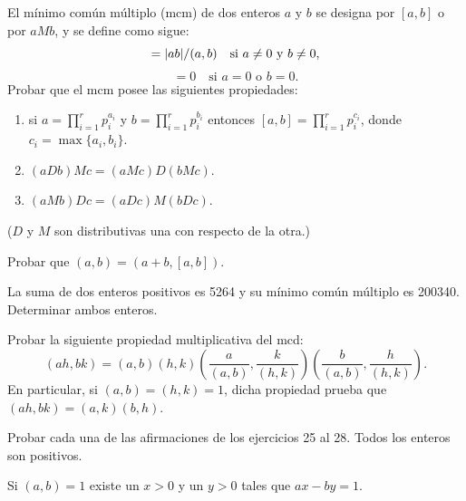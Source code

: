 \documentclass[12pt,a4paper]{book}
\begin{document}
    \begin{ejercicio}
        El mínimo común múltiplo (mcm) de dos enteros $a$ y $b$ se designa por $[a,b]$ o por
        $aMb$, y se define como sigue:
        \begin{equation*}
            [a,b]=\abs{ab}/(a,b)\quad\text{si } a\neq0 \text{ y } b\neq0,
        \end{equation*}
        \begin{equation*}
            [a,b]=0\quad\text{si } a=0 \text{ o } b=0.
        \end{equation*}
        Probar que el mcm posee las siguientes propiedades:
        \begin{enumerate}
            \item[(a)] si $a=\prod_{i=1}^{r}p_i^{a_i}$ y $b=\prod_{i=1}^{r}p_i^{b_i}$ entonces
            $[a,b]=\prod_{i=1}^{r}p_i^{c_i}$, donde $c_i=\max\{a_i,b_i\}$.
            \item[(b)] $(aDb)Mc=(aMc)D(bMc)$.
            \item[(c)] $(aMb)Dc=(aDc)M(bDc)$.
        \end{enumerate}
        ($D$ y $M$ son distributivas una con respecto de la otra.)
    \end{ejercicio}

    \begin{ejercicio}
        Probar que $(a,b)=(a+b,[a,b])$.
    \end{ejercicio}

    \begin{ejercicio}
        La suma de dos enteros positivos es 5264 y su mínimo común múltiplo es 200340.
        Determinar ambos enteros.
    \end{ejercicio}

    \begin{ejercicio}
        Probar la siguiente propiedad multiplicativa del mcd:
        \begin{equation*}
            (ah,bk)=(a,b)(h,k)\left(\frac{a}{(a,b)},\frac{k}{(h,k)}\right)
            \left(\frac{b}{(a,b)},\frac{h}{(h,k)}\right).
        \end{equation*}
        En particular, si $(a,b)=(h,k)=1$, dicha propiedad prueba que $(ah,bk)=(a,k)(b,h)$.
    \end{ejercicio}

    Probar cada una de las afirmaciones de los ejercicios 25 al 28. Todos los enteros son
    positivos.

    \begin{ejercicio}
        Si $(a,b)=1$ existe un $x>0$ y un $y>0$ tales que $ax-by=1$.
    \end{ejercicio}
\end{document}

